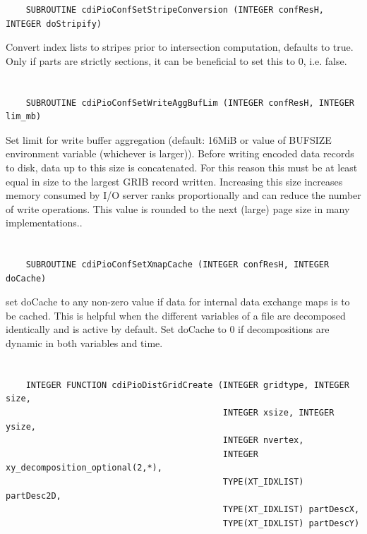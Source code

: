 \begin{verbatim}
    SUBROUTINE cdiPioConfSetStripeConversion (INTEGER confResH, INTEGER doStripify)
\end{verbatim}

Convert index lists to stripes prior
to intersection computation, defaults to true. Only if parts are
strictly sections, it can be beneficial to set this to 0, i.e. false.


\section*{\tt {}}

\begin{verbatim}
    SUBROUTINE cdiPioConfSetWriteAggBufLim (INTEGER confResH, INTEGER lim_mb)
\end{verbatim}

Set limit for write buffer aggregation
(default: 16MiB or value of BUFSIZE environment variable (whichever
is larger)). Before writing encoded data records to disk, data
up to this size is concatenated. For this reason this must be at
least equal in size to the largest GRIB record written.  Increasing
this size increases memory consumed by I/O server ranks
proportionally and can reduce the number of write operations. This
value is rounded to the next (large) page size in many implementations..


\section*{\tt {}}

\begin{verbatim}
    SUBROUTINE cdiPioConfSetXmapCache (INTEGER confResH, INTEGER doCache)
\end{verbatim}

set doCache to any non-zero value if data
for internal data exchange maps is to be cached. This is helpful
when the different variables of a file are decomposed identically
and is active by default. Set doCache to 0 if decompositions are
dynamic in both variables and time.


\section*{\tt {}}

\begin{verbatim}
    INTEGER FUNCTION cdiPioDistGridCreate (INTEGER gridtype, INTEGER size,
                                           INTEGER xsize, INTEGER ysize,
                                           INTEGER nvertex,
                                           INTEGER xy_decomposition_optional(2,*),
                                           TYPE(XT_IDXLIST) partDesc2D,
                                           TYPE(XT_IDXLIST) partDescX,
                                           TYPE(XT_IDXLIST) partDescY)
\end{verbatim}

